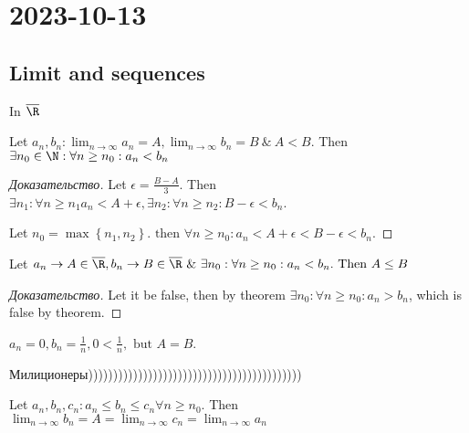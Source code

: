 \section{2023-10-13}

\subsection{Limit and sequences}

\begin{theorem}[]
In $\overline{\R}$

	Let $a_n, b_n: \lim_{n \to \infty} a_n = A, \lim_{n \to \infty} b_n = B \ \& \ A < B$. Then $\exists n_0 \in \N: \forall n \geq n_0: a_n < b_n $
\end{theorem}

\begin{proof}[Доказательство]
	Let $\epsilon = \frac{B-A}{3}$. Then $\exists n_1: \forall n \geq n_1 a_n < A + \epsilon, \exists n_2: \forall n \geq n_2: B - \epsilon < b_n$.

	Let $n_0 = \max \left\{ n_1, n_2 \right \}. \text{ then } \forall n \geq n_0: a_n < A + \epsilon < B - \epsilon < b_n $.
\end{proof}

\begin{corollary}
	Let $a_n \rightarrow A \in \overline{\R}, b_n \rightarrow B \in \overline{\R} \ \& \ \exists n_0: \forall n \geq n_0: a_n < b_n. \text{ Then } A \leq B$
\end{corollary}

\begin{proof}[Доказательство]
	Let it be false, then by theorem $\exists n_0 : \forall n \geq n_0: a_n > b_n$, which is false by theorem.
\end{proof}

\begin{note}
	\begin{example}[]
		$a_n = 0, b_n = \frac{1}{n}, 0 < \frac{1}{n}, \text{ but } A = B$.
	\end{example}
\end{note}

\begin{theorem}
	Милиционеры)))))))))))))))))))))))))))))))))))))))))))
	
	Let $a_n, b_n, c_n: a_n \leq b_n \leq c_n \forall n \geq n_0$. Then $\lim_{n \to \infty} b_n = A = \lim_{n \to \infty} c_n = \lim_{n \to \infty} a_n$ 
\end{theorem}

